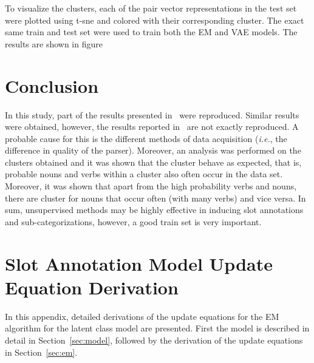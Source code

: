 \documentclass[11pt]{scrartcl}
\newcommand{\ie}{\textit{i.e.}}
\begin{document}
To visualize the clusters, each of the pair vector representations in the test set were plotted using t-sne and colored with their corresponding cluster. The exact same train and test set were used to train both the EM and VAE models. The results are shown in figure 

\section{Conclusion} %
In this study, part of the results presented
in~\cite{rooth1999inducing} were reproduced. Similar results were
obtained, however, the results reported in~\cite{rooth1999inducing}
are not exactly reproduced. A probable cause for this is the different
methods of data acquisition (\ie, the difference in quality of the
parser). Moreover, an analysis was performed on the clusters obtained
and it was shown that the cluster behave as expected, that is,
probable nouns and verbs within a cluster also often occur in the data
set. Moreover, it was shown that apart from the high probability verbs
and nouns, there are cluster for nouns that occur often (with many
verbs) and vice versa. In sum, unsupervised methods may be highly
effective in inducing slot annotations and sub-categorizations,
however, a good train set is very important.




\onecolumn
\appendix
\section{Slot Annotation Model Update Equation Derivation}
\label{sec:part1}
In this appendix, detailed derivations of the update equations for the
EM algorithm for the latent class model are presented. First the model
is described in detail in Section~\ref{sec:model}, followed by the
derivation of the update equations in Section~\ref{sec:em}.
\end{document}
